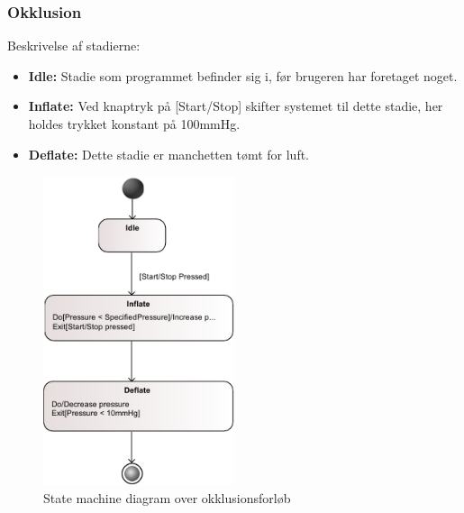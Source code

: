 \subsubsection{Okklusion}
Beskrivelse af stadierne:
\begin{itemize}
	\item \textbf{Idle:} Stadie som programmet befinder sig i, før brugeren har foretaget noget.
	\item \textbf{Inflate:} Ved knaptryk på [Start/Stop] skifter systemet til dette stadie, her holdes trykket konstant på 100mmHg.
	\item \textbf{Deflate:} Dette stadie er manchetten tømt for luft.
\end{itemize}
	\begin{figure}[H]
		\begin{center}
		\includegraphics[width=0.5\textwidth]{SystemArkitektur/pdfs/STM_Okklusion-crop.pdf}
		\caption{State machine diagram over okklusionsforløb}
	\end{center}
	\end{figure}

\newpage

